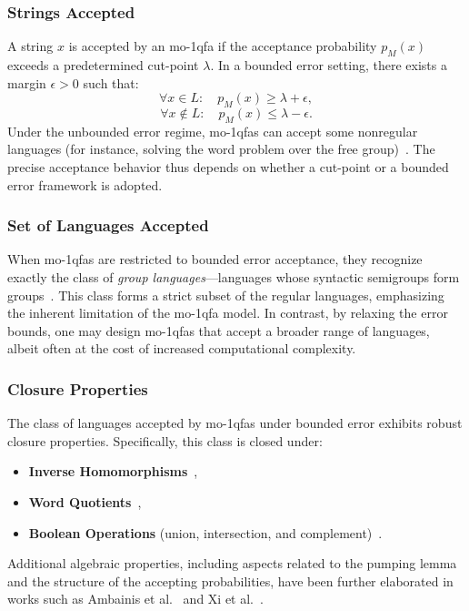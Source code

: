 \subsubsection{Strings Accepted}
A string $x$ is accepted by an \gls{mo-1qfa} if the acceptance probability $p_M(x)$ exceeds a predetermined cut-point $\lambda$. In a bounded error setting, there exists a margin $\epsilon > 0$ such that:
\[
\forall x\in L:\quad p_M(x) \ge \lambda + \epsilon,
\]
\[
\forall x\notin L:\quad p_M(x) \le \lambda - \epsilon.
\]
Under the unbounded error regime, \gls{mo-1qfa}s can accept some nonregular languages (for instance, solving the word problem over the free group)~\cite{brodsky2002characterizations}. The precise acceptance behavior thus depends on whether a cut-point or a bounded error framework is adopted.

\subsubsection{Set of Languages Accepted}
When \gls{mo-1qfa}s are restricted to bounded error acceptance, they recognize exactly the class of \emph{group languages}—languages whose syntactic semigroups form groups~\cite{brodsky2002characterizations}. This class forms a strict subset of the regular languages, emphasizing the inherent limitation of the \gls{mo-1qfa} model. In contrast, by relaxing the error bounds, one may design \gls{mo-1qfa}s that accept a broader range of languages, albeit often at the cost of increased computational complexity.

\subsubsection{Closure Properties}
The class of languages accepted by \gls{mo-1qfa}s under bounded error exhibits robust closure properties. Specifically, this class is closed under:
\begin{itemize}
    \item \textbf{Inverse Homomorphisms}~\cite{brodsky2002characterizations},
    \item \textbf{Word Quotients}~\cite{brodsky2002characterizations},
    \item \textbf{Boolean Operations} (union, intersection, and complement)~\cite{10.1007/11605157_1,10.1007/3-540-45007-6_1}.
\end{itemize}
Additional algebraic properties, including aspects related to the pumping lemma and the structure of the accepting probabilities, have been further elaborated in works such as Ambainis et al.~\cite{ambainis1999probabilities} and Xi et al.~\cite{Xi2008}.


